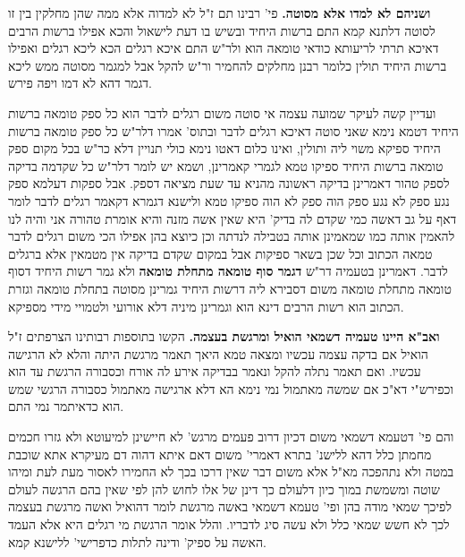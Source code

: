 \documentclass[12pt, openany]{book}
\newcommand{\sethebfont}{
\fontsize{10.5pt}{21.0pt} \selectfont
}
\newcommand{\twocol}[1]{
	{\sethebfont \begin{multicols}{2}
			#1
	\end{multicols}}	
}
\begin{document}
\twocol{\textbf{ושניהם לא למדו אלא מסוטה.}  פי' רבינו תם ז"ל לא למדוה אלא ממה שהן מחלקין בין זו לסוטה דלתנא קמא התם ברשות היחיד ובשיש בו דעת לישאול והכא אפילו ברשות הרבים דאיכא תרתי לריעותא כודאי טומאה הוא ולר"ש התם איכא רגלים הכא ליכא רגלים ואפילו ברשות היחיד תולין כלומר רבנן מחלקים להחמיר ור"ש להקל אבל למגמר מסוטה ממש ליכא דגמר דהא לא דמו ויפה פירש.\par  ועדיין קשה לעיקר שמועה עצמה אי סוטה משום רגלים לדבר הוא כל ספק טומאה ברשות היחיד דטמא נימא שאני סוטה דאיכא רגלים לדבר ובתוס' אמרו דלר"ש כל ספק טומאה ברשות היחיד ספיקא משוי ליה ותולין, ואינו כלום דאטו נימא כולי תנויין דלא כר"ש בכל מקום ספק טומאה ברשות היחיד ספיקו טמא לגמרי קאמרינן, ושמא יש לומר דלר"ש כל שקדמה בדיקה לספק טהור דאמרינן בדיקה ראשונה מהניא עד שעת מציאה דספק. אבל ספקות דעלמא ספק נגע ספק לא נגע ספק הוה ספק לא הוה ספיקו טמא ולישנא דגמרא דקאמר רגלים לדבר לומר דאף על גב דאשה כמי שקדם לה בדיק' היא שאין אשה מזנה והיא אומרת טהורה אני והיה לנו להאמין אותה כמו שמאמינן אותה בטבילה לנדתה וכן כיוצא בהן אפילו הכי משום רגלים לדבר טמאה הכתוב וכל שכן בשאר ספיקות אבל במקום שקדם בדיקה אין מטמאין אלא ברגלים לדבר. 
\parוהא דאמרינן בטעמיה דר"ש \textbf{דגמר סוף טומאה מתחלת טומאה}  ולא גמר רשות היחיד דסוף טומאה מתחלת טומאה משום דסבירא ליה דרשות היחיד גמרינן מסוטה בתחלת טומאה וגזרת הכתוב הוא רשות הרבים דינא הוא וגמרינן מיניה דלא אורועי ולטמויי מידי מספיקא. 
\par\textbf{ואב"א היינו טעמיה דשמאי הואיל ומרגשת בעצמה.}  הקשו בתוספות רבותינו הצרפתים ז"ל הואיל אם בדקה עצמה עכשיו ומצאה טמא היאך תאמר מרגשת היתה והלא לא הרגישה עכשיו. ואם תאמר נתלה להקל ונאמר בבדיקה אירע לה אורח וכסבורה הרגשת עד הוא וכפירש"י דא"כ אם שמשה מאתמול נמי נימא הא דלא ארגישה מאתמול כסבורה הרגשי שמש הוא כדאיתמר נמי התם.\par  והם פי' דטעמא דשמאי משום דכיון דרוב פעמים מרגש' לא חיישינן למיעוטא ולא גזרו חכמים מחמתן כלל דהא ללישנ' בתרא דאמרי' משום דאם איתא דהוה דם מעיקרא אתא שוכבת במטה ולא נתהפכה מא"ל אלא משום דבר שאין דרכו בכך לא החמירו לאסור מעת לעת ומיהו שוטה ומשמשת במוך כיון דלעולם כך דינן של אלו לחוש להן לפי שאין בהם הרגשה לעולם לפיכך שמאי מודה בהן ופי' טעמא דשמאי באשה מרגשת לומר דהואיל ואשה מרגשת בעצמה לכך לא חשש שמאי כלל ולא עשה סיג לדבריו. והלל אומר הרגשת מי רגלים היא אלא העמד האשה על ספיק' ודינה לתלות כדפרישי' ללישנא קמא. 
}
\end{document}
